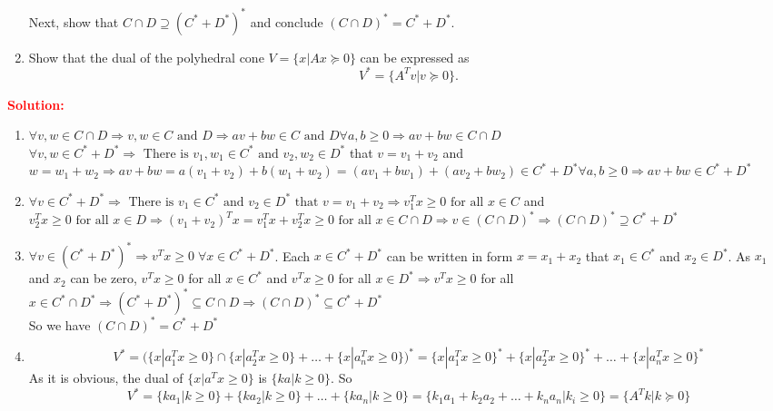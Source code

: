 \documentclass[a4paper]{article}
\begin{document}
\begin{latin}
\begin{enumerate}
	Next, show that $ C \cap D \supseteq (C^{*} + D^{*})^{*}  $ and conclude $ (C \cap D)^{*} = C^{*} + D^{*} $.
	\item Show that the dual of the polyhedral cone $ V = \{x | Ax \succeq 0\} $ can be expressed as
	\begin{equation*}
		V^{*} = \{A^{T} v | v \succeq 0\}.
	\end{equation*}
\end{enumerate}
\textcolor{red}{\textbf{Solution:}}
\begin{enumerate}
	\item 
	$ \forall v,w \in  C \cap D \Rightarrow v,w \in  C \text{ and } D \Rightarrow av + bw \in  C \text{ and } D \forall a,b\geq 0 \Rightarrow av + bw \in  C \cap D $ 
	\\
	$ \forall v,w \in  C^{*} + D^{*} \Rightarrow \text{ There is } v_{1},w_{1}\in C^{*} \text{ and }  v_{2},w_{2}\in D^{*} $ that $ v = v_{1} + v_{2} $ and $ w = w_{1} + w_{2} \Rightarrow av+bw = a(v_{1} + v_{2}) + b(w_{1} + w_{2}) = (av_{1}+bw_{1}) + (av_{2}+bw_{2}) \in C^{*} + D^{*} \forall a,b\geq 0 \Rightarrow av + bw \in  C^{*} + D^{*} $ 
	\item 
	$ \forall v \in C^{*} + D^{*} \Rightarrow \text{ There is } v_{1} \in C^{*} \text{ and }  v_{2} \in D^{*} \text{ that } v = v_{1} + v_{2} \Rightarrow v_{1}^{T}x \geq 0 \text{ for all } x \in C $ and $ v_{2}^{T}x \geq 0 \text{ for all } x \in D \Rightarrow (v_{1}+v_{2})^{T}x = v_{1}^{T}x+ v_{2}^{T}x \geq 0 \text{ for all } x \in C\cap D \Rightarrow v \in (C \cap D)^{*} \Rightarrow (C \cap D)^{*} \supseteq C^{*} + D^{*}$ 
	\item 
	$ \forall v \in (C^{*} + D^{*})^{*}\Rightarrow v^{T}x \geq 0 \; \forall x \in C^{*} + D^{*} $. Each $ x \in C^{*} + D^{*} $ can be written in form $ x = x_{1} + x_{2} $ that $ x_{1} \in C^{*} $ and $ x_{2} \in D^{*} $. As $ x_{1} $ and $ x_{2} $ can be zero, $ v^{T}x \geq 0 $ for all $ x \in C^{*} $ and $ v^{T}x \geq 0 $ for all $ x \in D^{*} \Rightarrow v^{T}x \geq 0 $ for all $ x \in C^{*} \cap D^{*} \Rightarrow (C^{*} + D^{*})^{*} \subseteq C \cap D \Rightarrow (C \cap D)^{*} \subseteq C^{*} + D^{*}$
	\\
	So we have $ (C \cap D)^{*} = C^{*} + D^{*} $
	\item 
	\begin{equation*}
		V^{*} = (\{x | a^{T}_{1} x \geq 0 \} \cap \{x | a^{T}_{2} x \geq 0 \} + \dots + \{x | a^{T}_{n} x \geq 0 \})^{*} = 
		\{x | a^{T}_{1} x \geq 0 \}^{*} + \{x | a^{T}_{2} x \geq 0 \}^{*} + \dots + \{x | a^{T}_{n} x \geq 0 \}^{*}
	\end{equation*}
	As it is obvious, the dual of $ \{x | a^{T} x \geq 0 \} $ is $ \{k a  | k \geq 0 \} $. So
	\begin{equation*}
		V^{*} = \{k a_{1}  | k \geq 0 \} + \{k a_{2}  | k \geq 0 \} + \dots + \{k a_{n}  | k \geq 0 \} = \{k_{1}a_{1} + k_{2}a_{2} + \dots + k_{n}a_{n} | k_{i} \geq 0 \} = \{A^{T} k | k \succeq 0\}
	\end{equation*}
\end{enumerate}
\end{latin}
\end{document}
